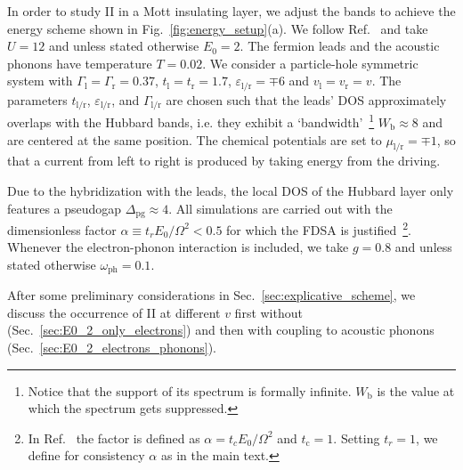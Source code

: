 \documentclass[aps,prb,groupedaddress,showpacs,twocolumn,superscriptaddress,10pt]{revtex4-2}
\begin{document}
In order to study II in a Mott insulating layer, we adjust the bands to achieve the energy scheme shown in Fig.~\ref{fig:energy_setup}(a). 
 We follow Ref.~\cite{so.do.18} and take $U=12$ and unless stated otherwise $E_0=2$. The fermion leads and the acoustic phonons have temperature $T=0.02$. We consider a particle-hole symmetric system with $\Gamma_{\text{l}}=\Gamma_{\text{r}}=0.37$, $t_{\text{l}}=t_{\text{r}}=1.7$, $\varepsilon_{\text{l}/\text{r}}=\mp 6$ and $v_{\text{l}}=v_{\text{r}}=v$. The parameters $t_{\text{l/r}}$, $\varepsilon_{\text{l/r}}$, and  $\Gamma_{\text{l/r}}$ are chosen such that the leads' DOS approximately overlaps with the Hubbard bands, i.e. they exhibit a \textquoteleft bandwidth\textquoteright~\footnote{Notice that the support of its spectrum is formally infinite. $W_{\text{b}}$ is the value at which the spectrum gets  suppressed.} $W_{\text{b}}\approx 8$ and are centered at the same position. The chemical potentials are set to $\mu_{\text{l}/\text{r}} =\mp 1$, so that a current from left to right is produced by taking energy from the driving.
  
Due to the hybridization with the leads, the local DOS of the Hubbard layer only features a pseudogap
 $\Delta_{\text{pg}} \approx 4$.
All simulations are carried out with the dimensionless factor $\alpha\equiv t_{r}E_0/\Omega^{2}<0.5$ for which the FDSA is justified~\footnote{In Ref.~\cite{so.do.18} the factor is defined as $\alpha=t_{c}E_0/\Omega^{2}$ and $t_{\text{c}}=1$. Setting $t_{r}=1$, we define for consistency $\alpha$ as in the main text.}. Whenever the electron-phonon interaction is included, we take $g=0.8$ and unless stated otherwise $\omega_{\text{ph}}=0.1$.

After some preliminary considerations in Sec.~\ref{sec:explicative_scheme}, we discuss the occurrence of II at different $v$ first without (Sec.~\ref{sec:E0_2_only_electrons}) and then with coupling to acoustic phonons (Sec.~\ref{sec:E0_2_electrons_phonons}). 
 
\end{document}
